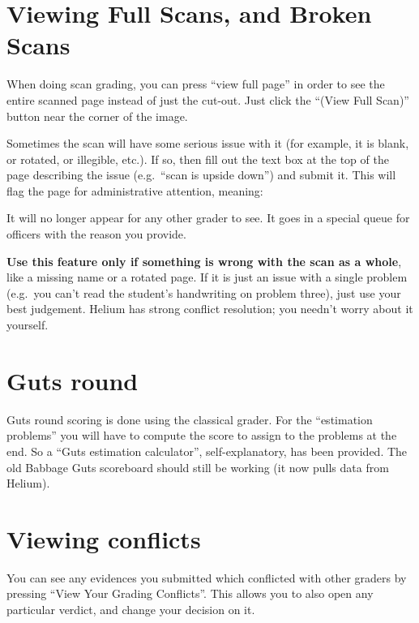 \section{Viewing Full Scans, and Broken Scans}
\label{sec:view_full}
When doing scan grading, you can press ``view full page''
in order to see the entire scanned page instead of just the cut-out.
Just click the ``(View Full Scan)'' button near the corner of the image.

Sometimes the scan will have some serious issue with it
(for example, it is blank, or rotated, or illegible, etc.).
If so, then fill out the text box at the top of the page
describing the issue (e.g.\ ``scan is upside down'') and submit it.
This will flag the page for administrative attention, meaning:
\begin{itemize}
	\ii It will no longer appear for any other grader to see.
	\ii It goes in a special queue for officers with the reason you provide.
\end{itemize}

\textbf{Use this feature only if something is wrong with the scan as a whole},
like a missing name or a rotated page.
If it is just an issue with a single problem
(e.g.\ you can't read the student's handwriting on problem three),
just use your best judgement.
Helium has strong conflict resolution; you needn't worry about it yourself.

\section{Guts round}
\begin{itemize}
	\ii Guts round scoring is done using the classical grader.
	\ii For the ``estimation problems'' you will have to compute the score
	to assign to the problems at the end.
	So a ``Guts estimation calculator'', self-explanatory,
	has been provided.
	\ii The old Babbage Guts scoreboard should still be working
	(it now pulls data from Helium).
\end{itemize}

\section{Viewing conflicts}
You can see any evidences you submitted which conflicted with other graders
by pressing ``View Your Grading Conflicts''.
This allows you to also open any particular verdict,
and change your decision on it.

